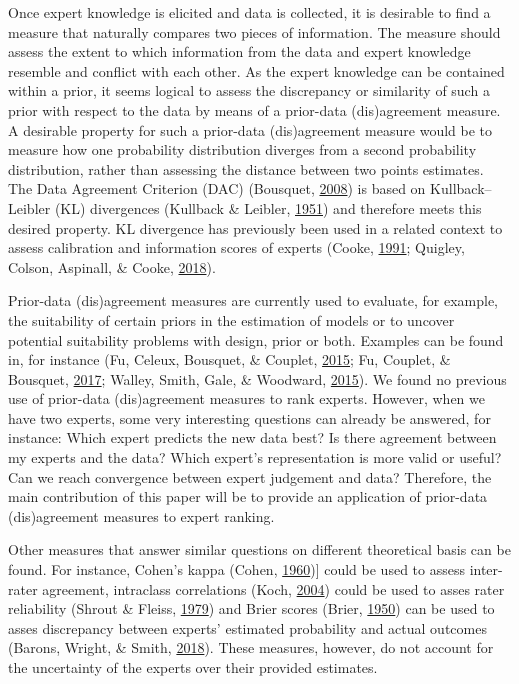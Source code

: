 \documentclass[openright,titlepage,12pt,a4paper]{book}
\begin{document}
Once expert knowledge is elicited and data is collected, it is desirable to find a measure that naturally compares two pieces of information. The measure should assess the extent to which information from the data and expert knowledge resemble and conflict with each other. As the expert knowledge can be contained within a prior, it seems logical to assess the discrepancy or similarity of such a prior with respect to the data by means of a prior-data (dis)agreement measure. A desirable property for such a prior-data (dis)agreement measure would be to measure how one probability distribution diverges from a second probability distribution, rather than assessing the distance between two points estimates. The Data Agreement Criterion (DAC) (Bousquet, \protect\hyperlink{ref-bousquet_diagnostics_2008}{2008}) is based on Kullback--Leibler (KL) divergences (Kullback \& Leibler, \protect\hyperlink{ref-kullback_information_1951}{1951}) and therefore meets this desired property. KL divergence has previously been used in a related context to assess calibration and information scores of experts (Cooke, \protect\hyperlink{ref-cooke_experts_1991}{1991}; Quigley, Colson, Aspinall, \& Cooke, \protect\hyperlink{ref-quigley_elicitation_2018}{2018}).

Prior-data (dis)agreement measures are currently used to evaluate, for example, the suitability of certain priors in the estimation of models or to uncover potential suitability problems with design, prior or both. Examples can be found in, for instance (Fu, Celeux, Bousquet, \& Couplet, \protect\hyperlink{ref-fu_bayesian_2015}{2015}; Fu, Couplet, \& Bousquet, \protect\hyperlink{ref-fu_adaptive_2017}{2017}; Walley, Smith, Gale, \& Woodward, \protect\hyperlink{ref-walley_advantages_2015}{2015}). We found no previous use of prior-data (dis)agreement measures to rank experts. However, when we have two experts, some very interesting questions can already be answered, for instance: Which expert predicts the new data best? Is there agreement between my experts and the data? Which expert's representation is more valid or useful? Can we reach convergence between expert judgement and data? Therefore, the main contribution of this paper will be to provide an application of prior-data (dis)agreement measures to expert ranking.

Other measures that answer similar questions on different theoretical basis can be found. For instance, Cohen's kappa (Cohen, \protect\hyperlink{ref-cohen_coefficient_1960}{1960}){]} could be used to assess inter-rater agreement, intraclass correlations (Koch, \protect\hyperlink{ref-koch_intraclass_2004}{2004}) could be used to asses rater reliability (Shrout \& Fleiss, \protect\hyperlink{ref-shrout_intraclass_1979}{1979}) and Brier scores (Brier, \protect\hyperlink{ref-brier_verification_1950}{1950}) can be used to asses discrepancy between experts' estimated probability and actual outcomes (Barons, Wright, \& Smith, \protect\hyperlink{ref-barons_eliciting_2018}{2018}). These measures, however, do not account for the uncertainty of the experts over their provided estimates.
\end{document}

